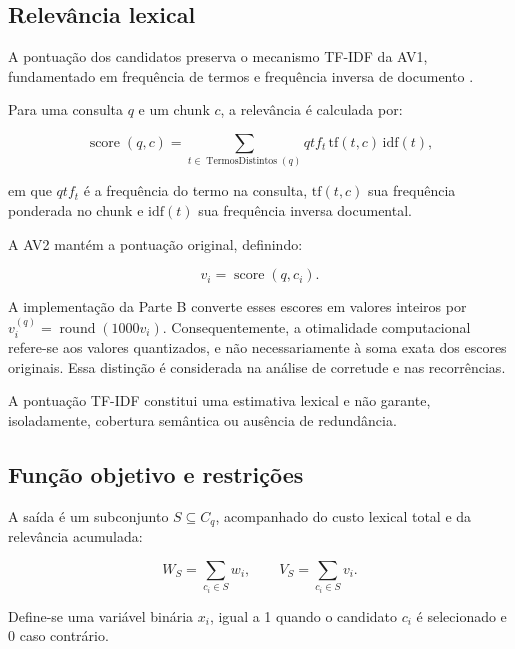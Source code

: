 \documentclass[11pt,a4paper]{article}
\theoremstyle{plain}
\theoremstyle{definition}
\theoremstyle{plain}
\begin{document}
\subsection{Relevância lexical}

A pontuação dos candidatos preserva o mecanismo
TF-IDF da AV1, fundamentado em frequência de
termos e frequência inversa de documento
\cite{manning2008information}.

Para uma consulta $q$ e um chunk $c$, a
relevância é calculada por:

\begin{equation}
\operatorname{score}(q,c)=
\sum_{t\in\operatorname{TermosDistintos}(q)}
qtf_t\,\mathrm{tf}(t,c)\,\mathrm{idf}(t),
\label{eq:score_tfidf}
\end{equation}

em que $qtf_t$ é a frequência do termo na consulta,
$\mathrm{tf}(t,c)$ sua frequência ponderada no chunk
e $\mathrm{idf}(t)$ sua frequência inversa documental.

A AV2 mantém a pontuação original, definindo:

\begin{equation}
v_i=\operatorname{score}(q,c_i).
\label{eq:valor_chunk}
\end{equation}

A implementação da Parte B converte esses escores
em valores inteiros por
$v_i^{(q)}=\operatorname{round}(1000v_i)$.
Consequentemente, a otimalidade computacional
refere-se aos valores quantizados, e não
necessariamente à soma exata dos escores
originais. Essa distinção é considerada na
análise de corretude e nas recorrências.

A pontuação TF-IDF constitui uma estimativa
lexical e não garante, isoladamente,
cobertura semântica ou ausência de redundância.

\subsection{Função objetivo e restrições}

A saída é um subconjunto $S\subseteq C_q$,
acompanhado do custo lexical total e da
relevância acumulada:

\begin{equation}
W_S=\sum_{c_i\in S}w_i,
\qquad
V_S=\sum_{c_i\in S}v_i.
\label{eq:saida_av2}
\end{equation}

Define-se uma variável binária $x_i$,
igual a 1 quando o candidato $c_i$ é
selecionado e 0 caso contrário.
\end{document}
